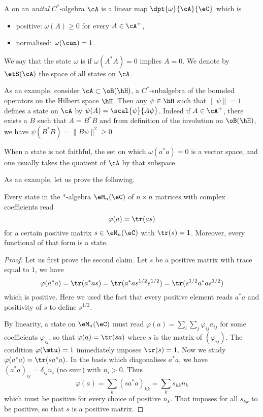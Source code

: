 \begin{definition}      \label{DefStateUnital}
A  on an \emph{unital} $C^*$-algebra $\cA$ is a linear map $\dpt{\omega}{\cA}{\eC}$ which is

\begin{itemize}
\item positive: $\omega(A)\geq 0$ for every $A\in\cA^+$, 
\item normalised: $\omega(\cun)=1$.
\end{itemize}
We say that the state $\omega$ is  if $\omega(A^*A)=0$ implies $A=0$. We denote by $\etS(\cA)$ the space of all states on $\cA$.
\end{definition}
As an example, consider $\cA\subset\oB(\hH)$, a $C^*$-subalgebra of the bounded operators on the Hilbert space $\hH$. Then any $\psi\in\hH$ such that $\| \psi \|=1$ defines a state on $\cA$ by $\psi(A)=\scal{\psi}{A\psi}$. Indeed if $A\in\cA^+$, there exists a $B$ such that $A=B^*B$ and from definition of the involution on $\oB(\hH)$, we have $\psi(B^*B)=\| B\psi \|^2\geq 0$.

When a state is not faithful, the set on which $\omega(a^*a)=0$ is a vector space, and one usually takes the quotient of $\cA$ by that subspace.

As an example, let us prove the following.
\begin{proposition}                 \label{Propstaretattraces}
Every state in the $*$-algebra $\eM_n(\eC)$ of $n\times n$ matrices with complex coefficients read
\begin{equation}
\varphi(a)=\tr(as)
\end{equation}
for a certain positive matrix $s\in\eM_{n}(\eC)$ with $\tr(s)=1$. Moreover, every functional of that form is a state.
\end{proposition}

\begin{proof}
    Let us first prove the second claim. Let $s$ be a positive matrix with trace equal to $1$, we have
    \[ 
      \varphi(a^*a)=\tr(a^*as)=\tr(a^*as^{1/2}s^{1/2})=\tr(s^{1/2}a^*as^{1/2})
    \]
    which is positive. Here we used the fact that every positive element reads $a^*a$ and positivity of $s$ to define $s^{1/2}$.

    By linearity, a state on $\eM_n(\eC)$ must read $\varphi(a)=\sum_i\sum_j\varphi_{ij}a_{ij}$ for some coefficients $\varphi_{ij}$, so that $\varphi(a)=\tr(sa)$ where $s$ is the matrix of $(\varphi_{ij})$. The condition $\varphi(\mtu)=1$ immediately imposes $\tr(s)=1$. Now we study $\varphi(a^*a)=\tr(sa^*a)$. In the basis which diagonalises $a^*a$, we have $(a^*a)_{ij}=\delta_{ij}n_i$ (no sum) with $n_i>0$.  Thus 
    \[ 
      \varphi(a)=\sum_k(sa^*a)_{kk}=\sum_ks_{kk}n_k
    \]
    which must be positive for every choice of positive $n_k$. That imposes for all $s_{kk}$ to be positive, so that $s$ is a positive matrix.
\end{proof}

